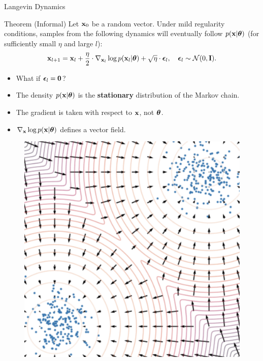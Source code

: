 \documentclass{beamer}
\begin{document}
\begin{frame}{Langevin Dynamics}
	\vspace{-0.4cm}
	\begin{block}{Theorem (Informal)}
		Let $\mathbf{x}_0$ be a random vector. Under mild regularity conditions, samples from the following dynamics will eventually follow $p(\mathbf{x} | \boldsymbol{\theta})$ (for sufficiently small $\eta$ and large $l$):
		\vspace{-0.3cm}
		\[
			\mathbf{x}_{l + 1} = \mathbf{x}_l + \frac{\eta}{2} \cdot \nabla_{\mathbf{x}_l} \log p(\mathbf{x}_l | \boldsymbol{\theta}) + \sqrt{\eta} \cdot \boldsymbol{\epsilon}_l, \quad \boldsymbol{\epsilon}_l \sim \mathcal{N}(0, \mathbf{I}).
		\]
		\vspace{-0.5cm}
	\end{block}
	\eqpause
	\begin{minipage}{0.55\linewidth}
		\begin{itemize}
			\item What if $\boldsymbol{\epsilon}_l = \boldsymbol{0}$?
			\item The density $p(\mathbf{x} | \boldsymbol{\theta})$ is the \textbf{stationary} distribution of the Markov chain.
			\item The gradient is taken with respect to $\mathbf{x}$, not $\boldsymbol{\theta}$.
			\item $\nabla_{\mathbf{x}} \log p(\mathbf{x} | \boldsymbol{\theta})$ defines a vector field.
		\end{itemize}
	\end{minipage}%
	\begin{minipage}{0.45\linewidth}
		\begin{figure}
			\centering
			\includegraphics[width=0.9\linewidth]{figs/langevin_dynamic}
		\end{figure}
	\end{minipage}
\end{frame}
\end{document}
